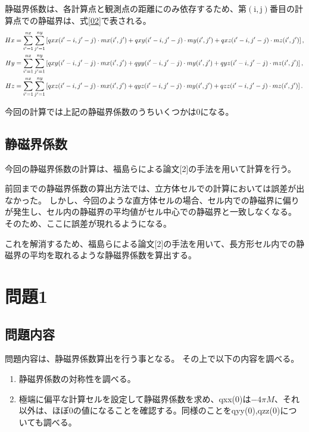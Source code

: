 \documentclass{jsarticle}
\begin{document}
静磁界係数は、各計算点と観測点の距離にのみ依存するため、第$\mathrm{(i,j)}$番目の計算点での静磁界は、式\ref{02}で表される。
\begin{align}
	Hx &= \sum_{i'=1}^{nx}\sum_{j'=1}^{ny}\left[ qxx(i'-i,j'-j)\cdot mx(i',j') + qxy(i'-i,j'-j)\cdot my(i',j') + qxz(i'-i,j'-j)\cdot mz(i',j') \right],	\notag \\
	Hy &= \sum_{i'=1}^{nx}\sum_{j'=1}^{ny}\left[ qxy(i'-i,j'-j)\cdot mx(i',j') + qyy(i'-i,j'-j)\cdot my(i',j') + qyz(i'-i,j'-j)\cdot mz(i',j') \right],	\label{02} \\
	Hz &= \sum_{i'=1}^{nx}\sum_{j'=1}^{ny}\left[ qxz(i'-i,j'-j)\cdot mx(i',j') + qyz(i'-i,j'-j)\cdot my(i',j') + qzz(i'-i,j'-j)\cdot mz(i',j') \right].	\notag 
\end{align}

今回の計算では上記の静磁界係数のうちいくつかは0になる。

\subsection{静磁界係数}
今回の静磁界係数の計算は、福島らによる論文[2]の手法を用いて計算を行う。

前回までの静磁界係数の算出方法では、立方体セルでの計算においては誤差が出なかった。
しかし、今回のような直方体セルの場合、セル内での静磁界に偏りが発生し、セル内の静磁界の平均値がセル中心での静磁界と一致しなくなる。
そのため、ここに誤差が現れるようになる。

これを解消するため、福島らによる論文[2]の手法を用いて、長方形セル内での静磁界の平均を取れるような静磁界係数を算出する。

\section{問題1}
\subsection{問題内容}
問題内容は、静磁界係数算出を行う事となる。
その上で以下の内容を調べる。
\begin{enumerate}
	\item 静磁界係数の対称性を調べる。
	\item 極端に偏平な計算セルを設定して静磁界係数を求め、qxx(0)は$-4\pi M$、それ以外は、ほぼ0の値になることを確認する。同様のことをqyy(0),qzz(0)についても調べる。
\end{enumerate}
\end{document}
